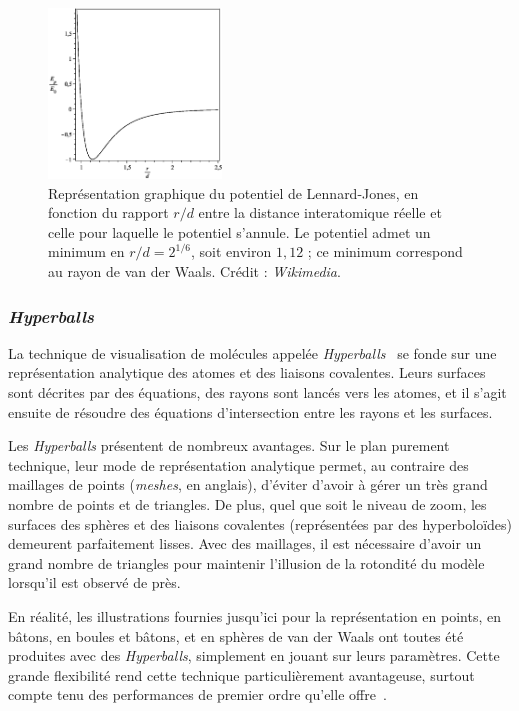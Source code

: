  	\begin{figure}
 		\centering
 		\includegraphics[width=0.41\textwidth]{figures/ch1/lennard-jones}
		\caption[Représentation graphique du potentiel de Lennard-Jones]{Représentation graphique du potentiel de Lennard-Jones, en fonction du rapport $r/d$ entre la distance interatomique réelle et celle pour laquelle le potentiel s'annule. Le potentiel admet un minimum en $r/d = 2^{1/6}$, soit environ $1,12$ ; ce minimum correspond au rayon de van der Waals. Crédit : \emph{Wikimedia}.}
 		\label{fig:lennard}
 	\end{figure}
	
	\subsubsection{\emph{Hyperballs}} La technique de visualisation de molécules appelée \emph{Hyperballs}~\cite{chavent2011gpu} se fonde sur une représentation analytique des atomes et des liaisons covalentes. Leurs surfaces sont décrites par des équations, des rayons sont lancés vers les atomes, et il s'agit ensuite de résoudre des équations d'intersection entre les rayons et les surfaces.
		
	Les \emph{Hyperballs} présentent de nombreux avantages. Sur le plan purement technique, leur mode de représentation analytique permet, au contraire des maillages de points (\emph{meshes}, en anglais), d'éviter d'avoir à gérer un très grand nombre de points et de triangles. De plus, quel que soit le niveau de zoom, les surfaces des sphères et des liaisons covalentes (représentées par des hyperboloïdes) demeurent parfaitement lisses.	Avec des maillages, il est nécessaire d'avoir un grand nombre de triangles pour maintenir l'illusion de la rotondité du modèle lorsqu'il est observé de près.
	
	En réalité, les illustrations fournies jusqu'ici pour la représentation en points, en bâtons, en boules et bâtons, et en sphères de van der Waals ont toutes été produites avec des \emph{Hyperballs}, simplement en jouant sur leurs paramètres. Cette grande flexibilité rend cette technique particulièrement avantageuse, surtout compte tenu des performances de premier ordre qu'elle offre~\cite{chavent2011gpu}.
		
